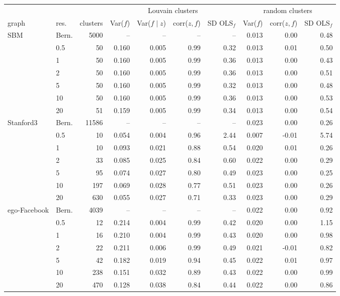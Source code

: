 \begin{tabular}{llrrrrrrrr}
\toprule
 & & & \multicolumn{4}{c}{Louvain clusters} & \multicolumn{3}{c}{random clusters} \\
\cmidrule(lr){4-7}\cmidrule(lr){8-10}
graph & res. & clusters & Var($f$) & Var($f\mid z$) & corr($z,f$) & SD OLS$_f$ & Var($f$) & corr($z,f$) & SD OLS$_f$ \\
\midrule
SBM & Bern. & 5000 & -- & -- & -- & -- & 0.013 & 0.00 & 0.48 \\
 & 0.5 & 50 & 0.160 & 0.005 & 0.99 & 0.32 & 0.013 & 0.01 & 0.50 \\
 & 1 & 50 & 0.160 & 0.005 & 0.99 & 0.36 & 0.013 & 0.00 & 0.43 \\
 & 2 & 50 & 0.160 & 0.005 & 0.99 & 0.36 & 0.013 & 0.00 & 0.51 \\
 & 5 & 50 & 0.160 & 0.005 & 0.99 & 0.32 & 0.013 & 0.00 & 0.48 \\
 & 10 & 50 & 0.160 & 0.005 & 0.99 & 0.36 & 0.013 & 0.00 & 0.53 \\
 & 20 & 51 & 0.159 & 0.005 & 0.99 & 0.34 & 0.013 & 0.00 & 0.54 \\
\addlinespace
Stanford3 & Bern. & 11586 & -- & -- & -- & -- & 0.023 & 0.00 & 0.26 \\
 & 0.5 & 10 & 0.054 & 0.004 & 0.96 & 2.44 & 0.007 & -0.01 & 5.74 \\
 & 1 & 10 & 0.093 & 0.021 & 0.88 & 0.54 & 0.020 & 0.01 & 0.26 \\
 & 2 & 33 & 0.085 & 0.025 & 0.84 & 0.60 & 0.022 & 0.00 & 0.29 \\
 & 5 & 95 & 0.074 & 0.027 & 0.80 & 0.49 & 0.023 & 0.00 & 0.25 \\
 & 10 & 197 & 0.069 & 0.028 & 0.77 & 0.51 & 0.023 & 0.00 & 0.26 \\
 & 20 & 630 & 0.055 & 0.027 & 0.71 & 0.33 & 0.023 & 0.00 & 0.29 \\
\addlinespace
ego-Facebook & Bern. & 4039 & -- & -- & -- & -- & 0.022 & 0.00 & 0.92 \\
 & 0.5 & 12 & 0.214 & 0.004 & 0.99 & 0.42 & 0.020 & 0.00 & 1.15 \\
 & 1 & 16 & 0.210 & 0.004 & 0.99 & 0.43 & 0.020 & 0.00 & 0.98 \\
 & 2 & 22 & 0.211 & 0.006 & 0.99 & 0.49 & 0.021 & -0.01 & 0.82 \\
 & 5 & 42 & 0.182 & 0.019 & 0.94 & 0.45 & 0.022 & 0.01 & 0.97 \\
 & 10 & 238 & 0.151 & 0.032 & 0.89 & 0.43 & 0.022 & 0.00 & 0.99 \\
 & 20 & 470 & 0.128 & 0.038 & 0.84 & 0.44 & 0.022 & 0.00 & 0.86 \\
\bottomrule
\end{tabular}
